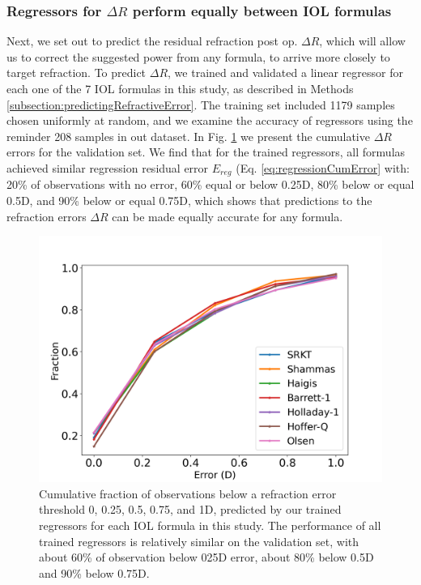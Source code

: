 \documentclass[article,twocolumn,preprint,10pt]{paper}%
\renewcommand{\(}{\left(}
\renewcommand{\)}{\right)}
\renewcommand{\[}{\left[}
\renewcommand{\]}{\right]}
\newcommand{\1}{\mbox{\boldmath$1$}}
\begin{document}
\subsubsection{Regressors for $\Delta R$ perform equally between IOL formulas}
Next, we set out to predict the residual refraction post op. $\Delta R$, which will allow us to correct the suggested power from any formula, to arrive more closely to target refraction. To predict $\Delta R$, we trained and validated a linear regressor for each one of the 7  IOL formulas in this study, as described in Methods \ref{subsection:predictingRefractiveError}.
The training set included 1179 samples chosen uniformly at random, and we examine the accuracy of regressors using the reminder 208 samples in out dataset.
In Fig. \ref{fig:cumulativeErrorRegressors} we present the cumulative $\Delta R$ errors for the validation set. We find that for the trained regressors, all formulas achieved similar regression residual error $E_{reg}$ (Eq. \ref{eq:regressionCumError} with: 20\% of observations with no error, 60\% equal or below 0.25D, 80\% below or equal 0.5D, and 90\% below or equal 0.75D, which shows that predictions to the refraction errors $\Delta R$ can be made equally accurate for any formula. 
\begin{figure}
	\centering
	\includegraphics[width=1\linewidth]{cumulativeRefErrRegressors}
	\caption{Cumulative fraction of observations below a refraction error threshold 0, 0.25, 0.5, 0.75, and 1D, predicted by our trained regressors for each IOL formula in this study. The performance of all trained regressors is relatively similar on the validation set, with about 60\% of observation below 025D error, about 80\% below 0.5D and 90\% below 0.75D.}
	\label{fig:cumulativeErrorRegressors}
\end{figure}
\end{document}
